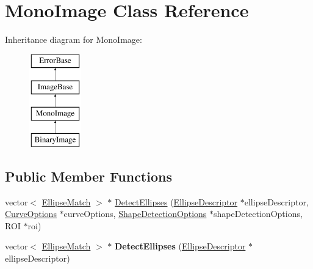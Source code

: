 \hypertarget{classMonoImage}{
\section{MonoImage Class Reference}
\label{classMonoImage}
}
Inheritance diagram for MonoImage:\begin{figure}[H]
\begin{center}
\leavevmode
\includegraphics[height=4.000000cm]{classMonoImage}
\end{center}
\end{figure}
\subsection*{Public Member Functions}
\begin{DoxyCompactItemize}
\item 
vector$<$ \hyperlink{structEllipseMatch__struct}{EllipseMatch} $>$ $\ast$ \hyperlink{classMonoImage_a967be5bee5832a54152c85c7633b3be8}{DetectEllipses} (\hyperlink{structEllipseDescriptor__struct}{EllipseDescriptor} $\ast$ellipseDescriptor, \hyperlink{structCurveOptions__struct}{CurveOptions} $\ast$curveOptions, \hyperlink{structShapeDetectionOptions__struct}{ShapeDetectionOptions} $\ast$shapeDetectionOptions, ROI $\ast$roi)
\item 
\hypertarget{classMonoImage_abda23726c4abc9f32a8211d50b166d7c}{
vector$<$ \hyperlink{structEllipseMatch__struct}{EllipseMatch} $>$ $\ast$ {\bfseries DetectEllipses} (\hyperlink{structEllipseDescriptor__struct}{EllipseDescriptor} $\ast$ellipseDescriptor)}
\label{classMonoImage_abda23726c4abc9f32a8211d50b166d7c}

\end{DoxyCompactItemize}



